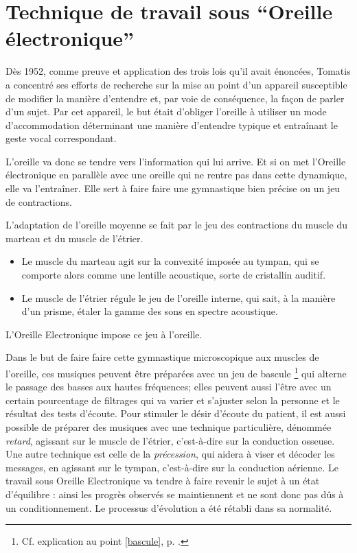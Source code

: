 \section{Technique de travail sous ``Oreille électronique''}

Dès 1952, comme preuve et application des trois lois qu'il avait énoncées,
Tomatis a concentré ses efforts de recherche sur la mise au point
d'un appareil susceptible de modifier la manière d'entendre et, par
voie de conséquence, la façon de parler d'un sujet. Par cet appareil,
le but était d'obliger l'oreille à utiliser un mode d'accommodation
déterminant une manière d'entendre typique et entraînant le geste
vocal correspondant.

L'oreille va donc se tendre
vers l'information qui lui arrive.  Et si on met l'Oreille électronique en parallèle avec une
oreille qui ne rentre pas dans cette dynamique, elle va l'entraîner.
Elle sert à faire faire une gymnastique bien précise ou un jeu de
contractions.

L'adaptation de l'oreille moyenne se fait par le jeu des contractions
du muscle du marteau et du muscle de l'étrier.
\begin{itemize}
\item Le muscle du marteau agit sur la convexité imposée au tympan, qui
se comporte alors comme une lentille acoustique, sorte de cristallin
auditif.
\item Le muscle de l'étrier régule le jeu de l'oreille interne, qui sait,
à la manière d'un prisme, étaler la gamme des sons en spectre acoustique.
\end{itemize}

L'Oreille Electronique impose ce jeu à l'oreille.


Dans le but de faire faire cette gymnastique microscopique aux muscles
de l'oreille, ces musiques peuvent être préparées avec un jeu de bascule%
\footnote{Cf. explication au point \ref{bascule}, p. \pageref{bascule}.} 
qui alterne le passage des basses aux hautes
fréquences; elles peuvent aussi l'être avec un certain pourcentage
de filtrages qui va varier et s'ajuster selon la personne
et le résultat des tests d'écoute. Pour stimuler le désir d'écoute
du patient, il est aussi possible de préparer des musiques avec une
technique particulière, dénommée \emph{retard}, agissant sur le muscle de
l'étrier, c'est-à-dire sur la conduction osseuse. Une autre technique
est celle de la \emph{précession}, qui aidera à viser et décoder les messages,
en agissant sur le tympan, c'est-à-dire sur la conduction aérienne. 
Le travail sous Oreille Electronique va tendre
à faire revenir le sujet à un état d'équilibre : ainsi les progrès
observés se maintiennent et ne sont donc pas dûs à un conditionnement.
Le processus d'évolution a été rétabli dans sa normalité.

